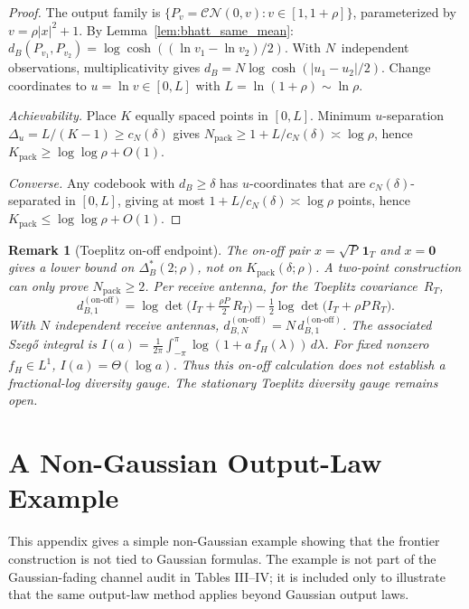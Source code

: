 \documentclass[lettersize,onecolumn]{IEEEtran}
\newtheorem{remark}{Remark}
\newcommand{\snr}{\rho}
\begin{document}
\begin{proof}
The output family is $\{P_v = \mathcal{CN}(0,v) :
v \in [1,1+\snr]\}$, parameterized by $v = \snr|x|^2+1$. By
Lemma~\ref{lem:bhatt_same_mean}:
$d_B(P_{v_1},P_{v_2}) = \log\cosh((\ln v_1-\ln v_2)/2)$.
With $N$~independent observations, multiplicativity gives
$d_B = N\log\cosh(|u_1-u_2|/2)$.
Change coordinates to $u = \ln v \in [0,L]$ with
$L = \ln(1+\snr) \sim \ln\snr$.

\emph{Achievability.}
Place $K$ equally spaced points in $[0,L]$. Minimum $u$-separation
$\Delta_u = L/(K-1) \ge c_N(\delta)$ gives
$N_{\mathrm{pack}} \ge 1+L/c_N(\delta) \asymp \log\snr$, hence
$K_{\mathrm{pack}} \ge \log\log\snr + O(1)$.

\emph{Converse.}
Any codebook with $d_B \ge \delta$ has $u$-coordinates that are
$c_N(\delta)$-separated in $[0,L]$, giving at most
$1+L/c_N(\delta) \asymp \log\snr$ points, hence
$K_{\mathrm{pack}} \le \log\log\snr + O(1)$.
\end{proof}

\begin{remark}[Toeplitz on-off endpoint]\label{rem:toeplitz_onoff}
The on-off pair $x = \sqrt{P}\,\mathbf{1}_T$ and $x = \mathbf{0}$
gives a lower bound on $\Delta_B^*(2;\snr)$, not on
$K_{\mathrm{pack}}(\delta;\snr)$. A two-point construction can only
prove $N_{\mathrm{pack}} \ge 2$.
Per receive antenna, for the Toeplitz covariance~$R_T$,
\[
d_{B,1}^{(\text{on-off})}
= \log\det\!\Big(I_T + \tfrac{\snr P}{2}\,R_T\Big)
  - \tfrac{1}{2}\log\det\!\big(I_T + \snr P\,R_T\big).
\]
With $N$ independent receive antennas,
$d_{B,N}^{(\text{on-off})} = N\,d_{B,1}^{(\text{on-off})}$.
The associated Szeg\H{o} integral is
$I(a) = \frac{1}{2\pi}\int_{-\pi}^{\pi}\log(1+a\,f_H(\lambda))
\,d\lambda$.
For fixed nonzero $f_H \in L^1$, $I(a) = \Theta(\log a)$.
Thus this on-off calculation does not establish a fractional-log
diversity gauge. The stationary Toeplitz diversity gauge remains
open.
\end{remark}

\section{A Non-Gaussian Output-Law Example}\label{app:non_gaussian}

This appendix gives a simple non-Gaussian example showing that the frontier construction is not tied to Gaussian formulas. The example is not part of the Gaussian-fading channel audit in Tables III--IV; it is included only to illustrate that the same output-law method applies beyond Gaussian output laws.
\end{document}

